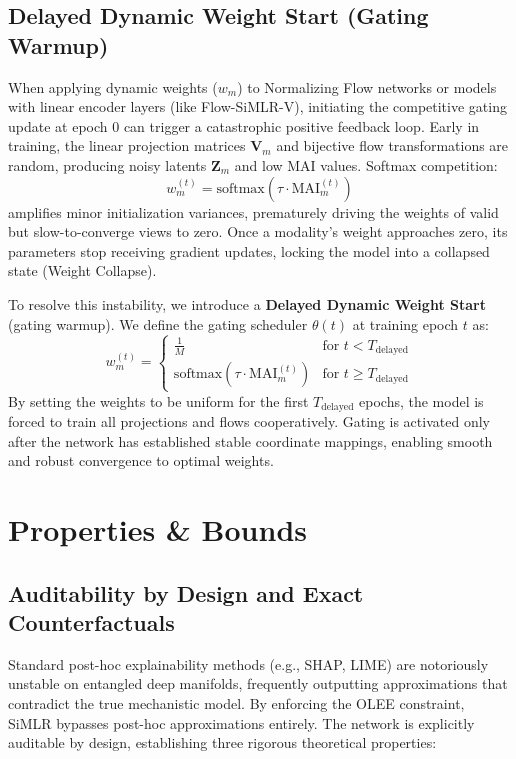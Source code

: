 \documentclass[
  letterpaper,
]{report}
\begin{document}
\subsection{Delayed Dynamic Weight Start (Gating
Warmup)}\label{delayed-dynamic-weight-start-gating-warmup}

When applying dynamic weights (\(w_m\)) to Normalizing Flow networks or
models with linear encoder layers (like Flow-SiMLR-V), initiating the
competitive gating update at epoch 0 can trigger a catastrophic positive
feedback loop. Early in training, the linear projection matrices
\(\mathbf{V}_m\) and bijective flow transformations are random,
producing noisy latents \(\mathbf{Z}_m\) and low MAI values. Softmax
competition:
\[ w_m^{(t)} = \text{softmax}(\tau \cdot \text{MAI}_m^{(t)}) \]
amplifies minor initialization variances, prematurely driving the
weights of valid but slow-to-converge views to zero. Once a modality's
weight approaches zero, its parameters stop receiving gradient updates,
locking the model into a collapsed state (Weight Collapse).

To resolve this instability, we introduce a \textbf{Delayed Dynamic
Weight Start} (gating warmup). We define the gating scheduler
\(\theta(t)\) at training epoch \(t\) as: \[ w_m^{(t)} = \begin{cases} 
\frac{1}{M} & \text{for } t < T_{\text{delayed}} \\
\text{softmax}(\tau \cdot \text{MAI}_m^{(t)}) & \text{for } t \ge T_{\text{delayed}}
\end{cases} \] By setting the weights to be uniform for the first
\(T_{\text{delayed}}\) epochs, the model is forced to train all
projections and flows cooperatively. Gating is activated only after the
network has established stable coordinate mappings, enabling smooth and
robust convergence to optimal weights.

\section{Properties \& Bounds}\label{properties-bounds}

\subsection{Auditability by Design and Exact
Counterfactuals}\label{auditability-by-design-and-exact-counterfactuals}

Standard post-hoc explainability methods (e.g., SHAP, LIME) are
notoriously unstable on entangled deep manifolds, frequently outputting
approximations that contradict the true mechanistic model. By enforcing
the OLEE constraint, SiMLR bypasses post-hoc approximations entirely.
The network is explicitly auditable by design, establishing three
rigorous theoretical properties:
\end{document}
